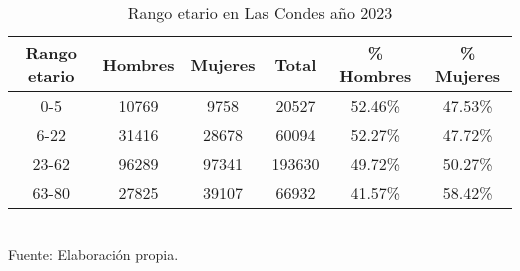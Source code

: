 \documentclass[12pt]{article} %
\begin{document}
\begin{table}[H]
    \centering
    \caption{Rango etario en Las Condes año 2023}
    \vspace{0.2cm}
    \begin{tabular}{|c|c|c|c|c|c|}
        \hline
        \textbf{Rango etario} & \textbf{Hombres} & \textbf{Mujeres} & \textbf{Total} & \textbf{\% Hombres} & \textbf{\% Mujeres} \\ \hline
        0-5 & 10769 & 9758 & 20527 & 52.46\% & 47.53\% \\ \hline
        6-22 & 31416 & 28678 & 60094 & 52.27\% & 47.72\% \\ \hline
        23-62 & 96289 & 97341 & 193630 & 49.72\% & 50.27\% \\ \hline
        63-80 & 27825 & 39107 & 66932 & 41.57\% & 58.42\% \\ \hline
    \end{tabular}
    \label{Cuadro 6}
    \vspace{0.2cm}
    \\Fuente: Elaboración propia.
\end{table}

\end{document}
